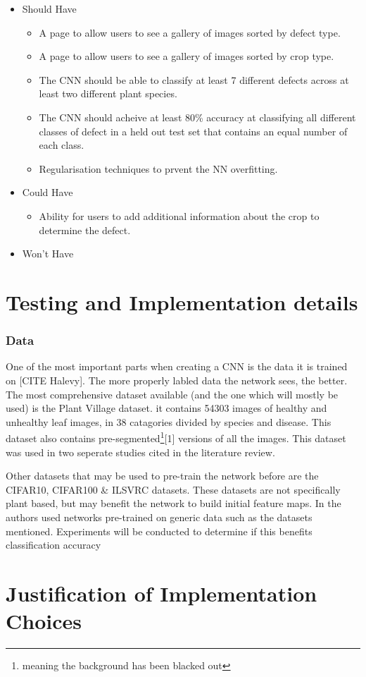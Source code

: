 \begin{itemize}
\begin{itemize}
  \end{itemize}
  \item Should Have
  \begin{itemize}
    \item A page to allow users to see a gallery of images sorted by
      defect type.
    \item A page to allow users to see a gallery of images sorted by
      crop type.
    \item The CNN should be able to classify at least 7 different defects across at least two different plant species.
    \item The CNN should acheive at least 80\% accuracy at classifying all different classes of defect in a held out test set that contains an equal number of each class.
  	\item Regularisation techniques to prvent the NN overfitting.
  \end{itemize}
  \item Could Have
  \begin{itemize}
    \item Ability for users to add additional information about the crop
      to determine the defect.
  \end{itemize}
  \item Won't Have
\end{itemize}
\section{Testing and Implementation details}
  \subsubsection{Data}
    One of the most important parts when creating a CNN is the data it is trained on [CITE Halevy]. The more properly labled data the network sees, the better. The most comprehensive dataset available (and the one which will mostly be used) is the Plant Village dataset. it contains 54303 images of healthy and unhealthy leaf images, in 38 catagories divided by species and disease. This dataset also contains pre-segmented\footnote{meaning the background has been blacked out}[1] versions of all the images. This dataset was used in two seperate studies cited in the literature review.
    \par
    Other datasets that may be used to pre-train the network before are the CIFAR10, CIFAR100 \& ILSVRC datasets. These datasets are not specifically plant based, but may benefit the network to build initial feature maps. In \cite{Choi} the authors used networks pre-trained on generic data such as the datasets mentioned. Experiments will be conducted to determine if this benefits classification accuracy

\section{Justification of Implementation Choices}
